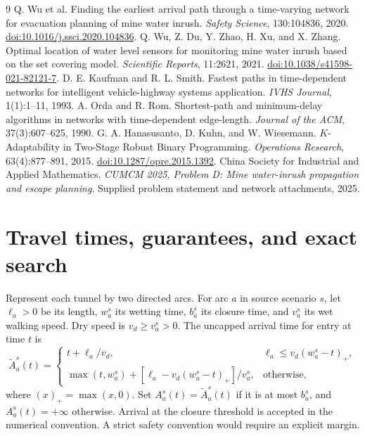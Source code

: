 \documentclass[11pt,a4paper]{article}
\begin{document}
\begin{thebibliography}{9}\small
{} Q. Wu et al. Finding the earliest arrival path through a time-varying network for evacuation planning of mine water inrush. \emph{Safety Science}, 130:104836, 2020. \href{https://doi.org/10.1016/j.ssci.2020.104836}{doi:10.1016/j.ssci.2020.104836}.
 Q. Wu, Z. Du, Y. Zhao, H. Xu, and X. Zhang. Optimal location of water level sensors for monitoring mine water inrush based on the set covering model. \emph{Scientific Reports}, 11:2621, 2021. \href{https://doi.org/10.1038/s41598-021-82121-7}{doi:10.1038/s41598-021-82121-7}.
 D. E. Kaufman and R. L. Smith. Fastest paths in time-dependent networks for intelligent vehicle-highway systems application. \emph{IVHS Journal}, 1(1):1--11, 1993.
 A. Orda and R. Rom. Shortest-path and minimum-delay algorithms in networks with time-dependent edge-length. \emph{Journal of the ACM}, 37(3):607--625, 1990.
 G. A. Hanasusanto, D. Kuhn, and W. Wiesemann. $K$-Adaptability in Two-Stage Robust Binary Programming. \emph{Operations Research}, 63(4):877--891, 2015. \href{https://doi.org/10.1287/opre.2015.1392}{doi:10.1287/opre.2015.1392}.
 China Society for Industrial and Applied Mathematics. \emph{CUMCM 2025, Problem D: Mine water-inrush propagation and escape planning}. Supplied problem statement and network attachments, 2025.
\end{thebibliography}
\clearpage
\appendix
\section{Travel times, guarantees, and exact search}\label{app:math}
Represent each tunnel by two directed arcs. For arc $a$ in source scenario $s$, let $\ell_a>0$ be its length, $w_a^s$ its wetting time, $b_a^s$ its closure time, and $v_a^s$ its wet walking speed. Dry speed is $v_d\ge v_a^s>0$. The uncapped arrival time for entry at time $t$ is
\[
 \widetilde A_a^s(t)=
 \begin{cases}
 t+\ell_a/v_d,&\ell_a\le v_d(w_a^s-t)_+,\\
 \max(t,w_a^s)+[\ell_a-v_d(w_a^s-t)_+]/v_a^s,&\text{otherwise},
 \end{cases}
\]
where $(x)_+=\max(x,0)$. Set $A_a^s(t)=\widetilde A_a^s(t)$ if it is at most $b_a^s$, and $A_a^s(t)=+\infty$ otherwise. Arrival at the closure threshold is accepted in the numerical convention. A strict safety convention would require an explicit margin.
\end{document}
